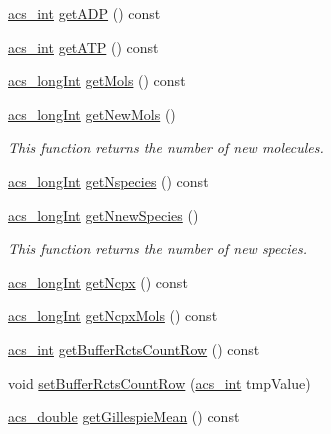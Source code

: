 \begin{DoxyCompactItemize}
\hyperlink{a00016_a8d277355641a098190360234e2ebde35}{acs\-\_\-int} \hyperlink{a00003_a69d18914fe7c8e96b10992668960b83b}{get\-A\-D\-P} () const 
\item 
\hyperlink{a00016_a8d277355641a098190360234e2ebde35}{acs\-\_\-int} \hyperlink{a00003_a02346c5d824e83e0a76dd01f4672ad8b}{get\-A\-T\-P} () const 
\item 
\hyperlink{a00016_a19319d75f02db4308bc5c0026d98cd85}{acs\-\_\-long\-Int} \hyperlink{a00003_a5a2ee72147144e7a04f4b363f1cc0914}{get\-Mols} () const 
\item 
\hyperlink{a00016_a19319d75f02db4308bc5c0026d98cd85}{acs\-\_\-long\-Int} \hyperlink{a00003_acae65ac60e1d746dc3063ae7948b684e}{get\-New\-Mols} ()
\begin{DoxyCompactList}\small\item\em This function returns the number of new molecules. \end{DoxyCompactList}\item 
\hyperlink{a00016_a19319d75f02db4308bc5c0026d98cd85}{acs\-\_\-long\-Int} \hyperlink{a00003_aebc2bf6d400686a73dae1f6162cfeadc}{get\-Nspecies} () const 
\item 
\hyperlink{a00016_a19319d75f02db4308bc5c0026d98cd85}{acs\-\_\-long\-Int} \hyperlink{a00003_a35fc896cc5fb146855f628e8c2067023}{get\-Nnew\-Species} ()
\begin{DoxyCompactList}\small\item\em This function returns the number of new species. \end{DoxyCompactList}\item 
\hyperlink{a00016_a19319d75f02db4308bc5c0026d98cd85}{acs\-\_\-long\-Int} \hyperlink{a00003_a5f6c40cbf788d58db588dc6280f0174f}{get\-Ncpx} () const 
\item 
\hyperlink{a00016_a19319d75f02db4308bc5c0026d98cd85}{acs\-\_\-long\-Int} \hyperlink{a00003_a39bb98a336b69f25479b8f82b9928bd3}{get\-Ncpx\-Mols} () const 
\item 
\hyperlink{a00016_a8d277355641a098190360234e2ebde35}{acs\-\_\-int} \hyperlink{a00003_ab87d94260cc7a7b388deca45fddb6031}{get\-Buffer\-Rcts\-Count\-Row} () const 
\item 
void \hyperlink{a00003_a634e0560af8805958d99e0ad8f0b5feb}{set\-Buffer\-Rcts\-Count\-Row} (\hyperlink{a00016_a8d277355641a098190360234e2ebde35}{acs\-\_\-int} tmp\-Value)
\item 
\hyperlink{a00016_ab776853a005fcbf56af0424a2a4dd607}{acs\-\_\-double} \hyperlink{a00003_a389a70abe42c7652c9511b7ed3b974c0}{get\-Gillespie\-Mean} () const 
\item 

\end{DoxyCompactItemize}
